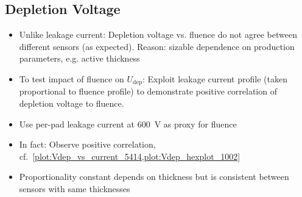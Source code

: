 \subsection{Depletion Voltage}
\label{subsec:irradiation_Vdep}

\begin{itemize}
	\item Unlike leakage current: Depletion voltage vs. fluence do not agree between different sensors (as expected). Reason: sizable dependence on production parameters, e.g. active thickness
	\item To test impact of fluence on $U_\text{dep}$: Exploit leakage current profile (taken proportional to fluence profile) to demonstrate positive correlation of depletion voltage to fluence.
	\item Use per-pad leakage current at \SI{600}{\volt} as proxy for fluence
	\item In fact: Observe positive correlation, cf.~\ref{plot:Vdep_vs_current_5414,plot:Vdep_hexplot_1002}
	\item Proportionality constant depends on thickness but is consistent between sensors with same thicknesses
\end{itemize}

